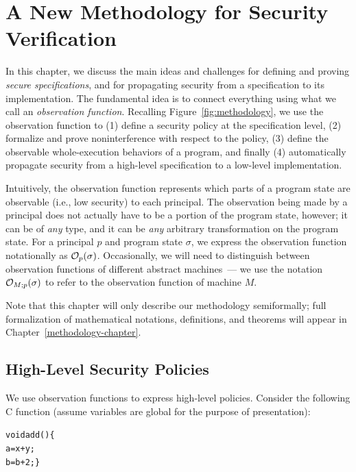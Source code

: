\label{informal-chapter}
\section{A New Methodology for Security Verification}
\label{informal-methodology}

In this chapter, we discuss the main ideas and challenges for defining 
and proving \emph{secure specifications}, and for propagating
security from a specification to its implementation. The fundamental
idea is to connect everything using what we call an 
\emph{observation function}. Recalling Figure~\ref{fig:methodology}, 
we use the observation function to (1) define a security policy at 
the specification level,
(2) formalize and prove noninterference with respect to the policy,
(3) define the observable whole-execution behaviors of a program,
and finally (4) automatically propagate security from a
high-level specification to a low-level implementation.

Intuitively, the observation function represents which parts of 
a program state are observable (i.e., low security) to each principal.
The observation being made by a principal does not actually have to be a 
portion of the program state, however; it can be of \emph{any} type,
and it can be \emph{any} arbitrary transformation on the program state.
For a principal $p$ and program state $\sigma$, we express the
observation function notationally as $\mathcal{O}_{p}(\sigma)$. Occasionally,
we will need to distinguish between observation functions of different 
abstract machines~--- we use the notation $\mathcal{O}_{M;p}(\sigma)$ to
refer to the observation function of machine $M$.

Note that this chapter will only describe our methodology semiformally;
full formalization of mathematical notations, definitions, and theorems
will appear in Chapter~\ref{methodology-chapter}.

\subsection{High-Level Security Policies}
\label{informal-policies}

We use observation functions to express high-level policies. Consider 
the following C function (assume variables are global for the purpose
of presentation):

{\small\begin{alltt}  void add() \{
      a = x + y;
      b = b + 2; \}
\end{alltt}}%


